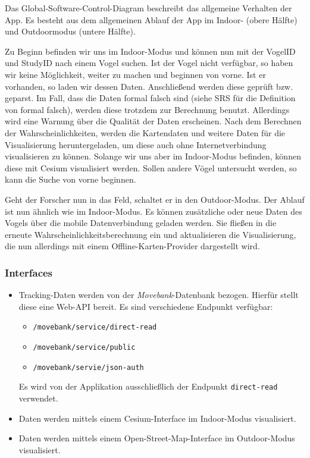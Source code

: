 \documentclass[12pt]{article} %
\begin{document}
\vspace{1em}

Das Global-Software-Control-Diagram beschreibt das allgemeine Verhalten der App. Es besteht aus dem allgemeinen Ablauf der App im Indoor- (obere Hälfte) und Outdoormodus (untere Hälfte). 

Zu Beginn befinden wir uns im Indoor-Modus und können nun mit der VogelID und StudyID nach einem Vogel suchen. Ist der Vogel nicht verfügbar, so haben wir keine Möglichkeit, weiter zu machen und beginnen von vorne. Ist er vorhanden, so laden wir dessen Daten. Anschließend werden diese geprüft bzw. geparst. Im Fall, dass die Daten formal falsch sind (siehe SRS für die Definition von formal falsch), werden diese trotzdem zur Berechnung benutzt. Allerdings wird eine Warnung über die Qualität der Daten erscheinen. Nach dem Berechnen der Wahrscheinlichkeiten, werden die Kartendaten und weitere Daten für die Visualisierung heruntergeladen, um diese auch ohne Internetverbindung visualisieren zu können. Solange wir uns aber im Indoor-Modus befinden, können diese mit Cesium visualisiert werden. Sollen andere Vögel untersucht werden, so kann die Suche von vorne beginnen.

Geht der Forscher nun in das Feld, schaltet er in den Outdoor-Modus. Der Ablauf ist nun ähnlich wie im Indoor-Modus. Es können zusätzliche oder neue Daten des Vogels über die mobile Datenverbindung geladen werden. Sie fließen in die erneute Wahrscheinlichkeitsberechnung ein und aktualisieren die Visualisierung, die nun allerdings mit einem Offline-Karten-Provider dargestellt wird. 

\subsubsection{Interfaces}
\label{sec:interfaces}
\begin{itemize}
	\item Tracking-Daten werden von der \textit{Movebank}-Datenbank bezogen. Hierfür stellt diese eine Web-API bereit. Es sind verschiedene Endpunkt verfügbar:
	\begin{itemize} 
	 	 \item  \lstinline$/movebank/service/direct-read$ 
	 	 \item \lstinline$/movebank/service/public$
	 	 \item \lstinline$/movebank/servie/json-auth$
	\end{itemize} 
	Es wird von der Applikation ausschließlich der Endpunkt \lstinline$direct-read$ verwendet.
	\item Daten werden mittels einem Cesium-Interface im Indoor-Modus visualisiert.
	\item Daten werden mittels einem Open-Street-Map-Interface im Outdoor-Modus visualisiert.
\end{itemize}
\end{document}
